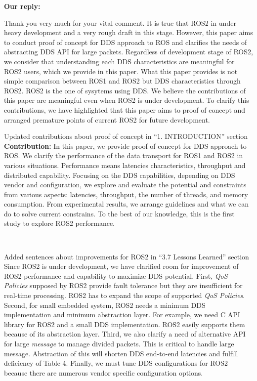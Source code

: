 \documentclass{article}
\begin{document}
\begin{itemize}
  \begin{flushleft}
    \textbf{Our reply:}
  \end{flushleft}
  Thank you very much for your vital comment.
  It is true that ROS2 in under heavy development and a very rough draft in this stage.
  However, this paper aims to conduct proof of concept for DDS approach to ROS and clarifies the needs of abstracting DDS API for large packets.
  Regardless of development stage of ROS2, we consider that understanding each DDS characteristics are meaningful for ROS2 users, which we provide in this paper.
  What this paper provides is not simple comparison between ROS1 and ROS2 but DDS characteristics through ROS2.
  ROS2 is the one of sysytems using DDS.
  We believe the contributions of this paper are meaningful even when ROS2 is under development.
  To clarify this contributions, we have highlighted that this paper aims to proof of concept and arranged premature points of current ROS2 for future development.
  \begin{itembox}[|]{Updated contributions about proof of concept in ``1. INTRODUCTION'' section}
    \textbf{Contribution:}
    In this paper, we provide proof of concept for DDS approach to ROS.
      We clarify the performance of the data transport for ROS1 and ROS2 in various situations.
      Performance means latencies characteristics, throughput and distributed capability.
      Focusing on the DDS capabilities, depending on DDS vendor and configuration, we explore and evaluate the potential and constraints from various aspects: latencies, throughput, the number of threads, and memory consumption.
      From experimental results, we arrange guidelines and what we can do to solve current constrains.
      To the best of our knowledge, this is the first study to explore ROS2 performance.
  \end{itembox}\\
  \begin{itembox}[|]{Added sentences about improvements for ROS2 in ``3.7 Lessons Learned'' section}
    Since ROS2 is under development, we have clarified room for improvement of ROS2 performance and capability to maximize DDS potential.
    First, \emph{QoS Policies} supposed by ROS2 provide fault tolerance but they are insufficient for real-time processing.
    ROS2 has to expand the scope of supported \emph{QoS Policies}.
    Second, for small embedded system, ROS2 needs a minimum DDS implementation and minimum abstraction layer.
    For example, we need C API library for ROS2 and a small DDS implementation.
    ROS2 easily supports them because of its abstraction layer.
    Third, we also clarify a need of alternative API for large \emph{message} to manage divided packets.
    This is critical to handle large message.
    Abstraction of this will shorten DDS end-to-end latencies and fulfill deficiency of Table 4.
    Finally, we must tune DDS configurations for ROS2 because there are numerous vendor specific configuration options.
  \end{itembox}\\

\end{itemize}
\end{document}
